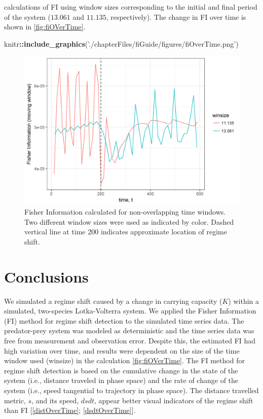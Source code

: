 \documentclass[12pt,twoside,openany]{reedthesis}
\newenvironment{Shaded}{\begin{snugshade}}{\end{snugshade}}
\newcommand{\KeywordTok}[1]{\textcolor[rgb]{0.13,0.29,0.53}{\textbf{#1}}}
\newcommand{\StringTok}[1]{\textcolor[rgb]{0.31,0.60,0.02}{#1}}
\newcommand{\OperatorTok}[1]{\textcolor[rgb]{0.81,0.36,0.00}{\textbf{#1}}}
\newcommand{\NormalTok}[1]{#1}
\begin{document}
calculations of FI using window sizes corresponding to the initial and
final period of the system (\(13.061\) and \(11.135\), respectively).
The change in FI over time is shown in \ref{fig:fiOVerTime}.
\begin{Shaded}
\begin{Highlighting}[]
\NormalTok{knitr}\OperatorTok{::}\KeywordTok{include_graphics}\NormalTok{(}\StringTok{'./chapterFiles/fiGuide/figures/fiOverTime.png'}\NormalTok{)}
\end{Highlighting}
\end{Shaded}
\begin{figure}
\includegraphics[width=27.08in]{./chapterFiles/fiGuide/figures/fiOverTime} \caption{Fisher Information calculated for non-overlapping time windows. Two different window sizes were used as indicated by color. Dashed vertical line at time 200 indicates approximate location of regime shift.}\label{fig:fiOverTime}
\end{figure}
\section{Conclusions}\label{conclusions-1}

We simulated a regime shift caused by a change in carrying capacity
(\(K\)) within a simulated, two-species Lotka-Volterra system. We
applied the Fisher Information (FI) method for regime shift detection to
the simulated time series data. The predator-prey system was modeled as
deterministic and the time series data was free from measurement and
observation error. Despite this, the estimated FI had high variation
over time, and results were dependent on the size of the time window
used (winsize) in the calculation \ref{fig:fiOVerTime}. The FI method
for regime shift detection is based on the cumulative change in the
state of the system (i.e., distance traveled in phase space) and the
rate of change of the system (i.e., speed tangential to trajectory in
phase space). The distance travelled metric, \(s\), and its speed,
\(dsdt\), appear better visual indicators of the regime shift than FI
{[}\ref{distOverTime}; \ref{dsdtOverTime}{]}.
\end{document}
